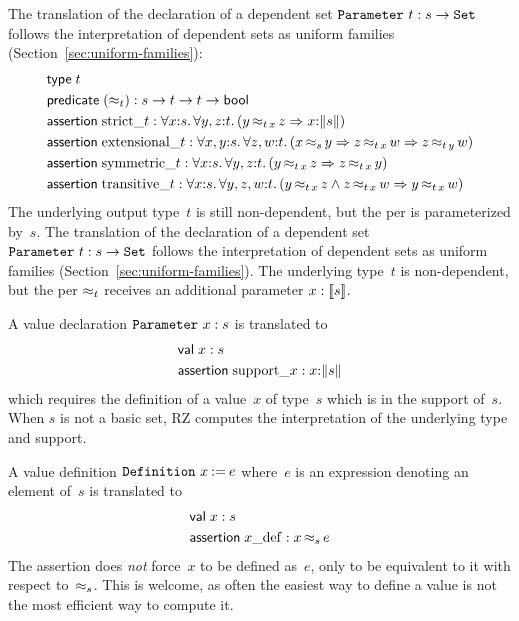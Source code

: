 \iflong
The translation of the declaration of a dependent set
$\iParameter{t}{s \to \iSet}$ follows the interpretation of dependent
sets as uniform families (Section~\ref{sec:uniform-families}):
%
\begin{align*}  
  & \otyspec{t} \\
  & \opropspec{({\approx_{t}})}{\oarrow{s}{\oarrow{t}{\oarrow{t}{\oProp}}}}\\
  & \oassertion{\mathrm{strict}\_{t}}{
    \oforall{x}{s}{
      \oforall{y,z}{t}{
        (\oimply{\oper{\oapp{t}{x}}{y}{z}}{\ototal{x}{s}})
      }
    }
  } \\
  & \oassertion{\mathrm{extensional}\_{t}}{
    \oforall{x,y}{s}{
      \oforall{z,w}{t}{
        (\oimply{\oper{s}{x}{y}}{
          \oimply{\oper{\oapp{t}{x}}{z}{w}}{\oper{\oapp{t}{y}}{z}{w}}
        })
      }
    }
  } \\
  & \oassertion{\mathrm{symmetric}\_{t}}{
    \oforall{x}{s}{
      \oforall{y,z}{t}{(\oimply{\oper{\oapp{t}{x}}{y}{z}}{\oper{\oapp{t}{x}}{z}{y}})}
    }
  }
  \\
  & \oassertion{\mathrm{transitive}\_{t}}{
    \oforall{x}{s}{
      \oforall{y,z,w}{t}{(
        \oimply{
          \oper{\oapp{t}{x}}{y}{z} \land \oper{\oapp{t}{x}}{z}{w}
        }{\oper{\oapp{t}{x}}{y}{w}}
        )}
    }
  }
\end{align*}
%
The underlying output type~$t$ is still non-dependent, but the per is
parameterized by~$s$.
\else %
The translation of the declaration of a dependent set
$\iParameter{t}{s \to \iSet}$ follows the interpretation of dependent
sets as uniform families (Section~\ref{sec:uniform-families}). The
underlying type~$t$ is non-dependent, but the per $\per_t$ receives an
additional parameter $x : \values{s}$.
\fi %

A value declaration $\iParameter{x}{s}$ is translated to
%
\begin{align*}
  & \ovalspec{x}{s} \\
  & \oassertion{\mathrm{support}\_x}{\ototal{x}{s}}
\end{align*}
%
which requires the definition of a value~$x$ of type~$s$ which is in
the support of~$s$. When $s$ is not a basic set, RZ computes the
interpretation of the underlying type and support.

A value definition $\iDefinition{x}{e}$ where~$e$ is an expression
denoting an element of~$s$ is translated to
%
\begin{align*}
  & \ovalspec{x}{s} \\
  & \oassertion{x\_\mathrm{def}}{\oper{s}{x}{e}}
\end{align*}
%
The assertion does \emph{not} force~$x$ to be defined as~$e$, only to
be equivalent to it with respect to~$\per_s$. This is welcome, as
often the easiest way to define a value is not the most efficient
way to compute it.

